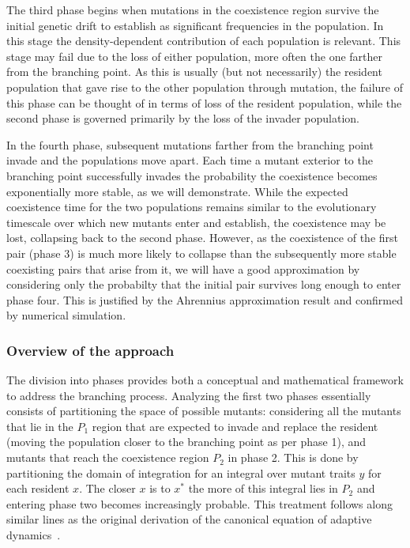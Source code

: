 \documentclass[authoryear,review,11pt]{elsarticle}
\begin{document}
The third phase begins when mutations in the coexistence region survive the initial genetic drift to establish as significant frequencies in the population.  In this stage the density-dependent contribution of each population is relevant.  This stage may fail due to the loss of either population, more often the one farther from the branching point.  As this is usually (but not necessarily) the resident population that gave rise to the other population through mutation, the failure of this phase can be thought of in terms of loss of the resident population, while the second phase is governed primarily by the loss of the invader population.  

In the fourth phase, subsequent mutations farther from the branching point invade and the populations move apart.  Each time a mutant exterior to the branching point successfully invades the probability the coexistence becomes exponentially more stable, as we will demonstrate.  While the expected coexistence time for the two populations remains similar to the evolutionary timescale over which new mutants enter and establish, the coexistence may be lost, collapsing back to the second phase.  However, as the coexistence of the first pair (phase 3) is much more likely to collapse than the subsequently more stable coexisting pairs that arise from it, we will have a good approximation by considering only the probabilty that the initial pair survives long enough to enter phase four.  This is justified by the Ahrennius approximation result and confirmed by numerical simulation.


\subsubsection{Overview of the approach}
The division into phases provides both a conceptual and mathematical framework to address the branching process.  Analyzing the first two phases essentially consists of partitioning the space of possible mutants: considering all the mutants that lie in the $P_1$ region that are expected to invade and replace the resident (moving the population closer to the branching point as per phase 1), and mutants that reach the coexistence region $P_2$ in phase 2.  This is done by partitioning the domain of integration for an integral over mutant traits $y$ for each resident $x$.  The closer $x$ is to $x^*$ the more of this integral lies in $P_2$ and entering phase two becomes increasingly probable.  This treatment follows along similar lines as the original derivation of the canonical equation of adaptive dynamics~\citep{dieckmann_jmb1996}.  
\end{document}
